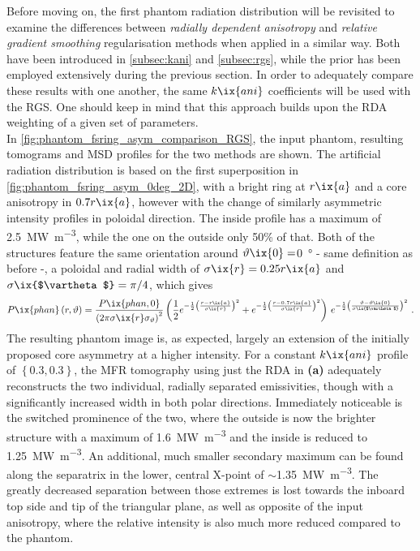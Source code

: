 %
                Before moving on, the first phantom radiation distribution will be revisited to examine the differences between \textit{radially dependent anisotropy} and \textit{relative gradient smoothing} regularisation methods when applied in a similar way. Both have been introduced in \cref{subsec:kani} and \cref{subsec:rgs}, while the prior has been employed extensively during the previous section. In order to adequately compare these results with one another, the same $k\ix{ani}$ coefficients will be used with the RGS. One should keep in mind that this approach builds upon the RDA weighting of a given set of parameters.\\%
                In \cref{fig:phantom_fsring_asym_comparison_RGS}, the input phantom, resulting tomograms and MSD profiles for the two methods are shown. The artificial radiation distribution is based on the first superposition in \cref{fig:phantom_fsring_asym_0deg_2D}, with a bright ring at $r\ix{a}$ and a core anisotropy in $0.7r\ix{a}$, however with the change of similarly asymmetric intensity profiles in poloidal direction. The inside profile has a maximum of \SI{2.5}{\mega\watt\per\cubic\meter}, while the one on the outside only 50\% of that. Both of the structures feature the same orientation around $\vartheta\ix{0}=$\SI{0}{\degree} - same definition as before -, a poloidal and radial width of $\sigma\ix{r}=0.25r\ix{a}$ and $\sigma\ix{$\vartheta$}=\pi/4$, which gives%
%
                \begin{align}%
                    P\ix{phan}\left(r,\vartheta\right)=%
                    \frac{P\ix{phan,0}}{\left(2\pi\sigma\ix{r}\sigma_{\vartheta}\right)^{2}}
                    \left(\frac{1}{2}e^{-\frac{1}{2}\left(\frac{r-r\ix{a}}{\sigma\ix{r}}\right)^{2}}+%
                    e^{-\frac{1}{2}\left(\frac{r-0.7r\ix{a}}{\sigma\ix{r}}\right)^{2}}\right)\,%
                    e^{-\frac{1}{2}\left(\frac{\vartheta-\vartheta\ix{0}}{\sigma\ix{$\vartheta$}}\right)^{2}}
                    \,\,.\nonumber%
                \end{align}%
%
                The resulting phantom image is, as expected, largely an extension of the initially proposed core asymmetry at a higher intensity. For a constant $k\ix{ani}$ profile of $\left\{0.3, 0.3\right\}$, the MFR tomography using just the RDA in \textbf{(a)} adequately reconstructs the two individual, radially separated emissivities, though with a significantly increased width in both polar directions. Immediately noticeable is the switched prominence of the two, where the outside is now the brighter structure with a maximum of \SI{1.6}{\mega\watt\per\cubic\meter} and the inside is reduced to \SI{1.25}{\mega\watt\per\cubic\meter}. An additional, much smaller secondary maximum can be found along the separatrix in the lower, central X-point of $\sim$\SI{1.35}{\mega\watt\per\cubic\meter}. The greatly decreased separation between those extremes is lost towards the inboard top side and tip of the triangular plane, as well as opposite of the input anisotropy, where the relative intensity is also much more reduced compared to the phantom.\\%
